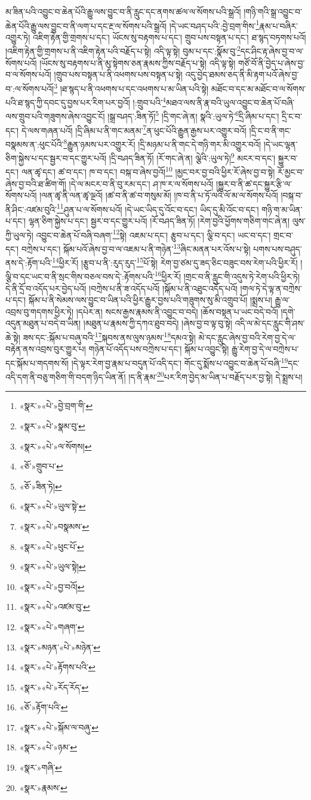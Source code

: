 མ་ཟིན་པའི་འབྱུང་བ་ཆེན་པོའི་རྒྱུ་ལས་བྱུང་བ་ནི་རླུང་དང་ནགས་ཚལ་ལ་སོགས་པའི་སྒྲའོ། །གཉི་གའི་སྒྲ་འབྱུང་བ་ཆེན་པོའི་རྒྱུ་ལས་བྱུང་བ་ནི་ལག་པ་དང་རྔ་ལ་སོགས་པའི་སྒྲའོ། །དེ་ཡང་བཤད་པའི་:བྱེ་བྲག་གིས་\footnote{«སྣར་»«པེ་»བྱེ་བྲག་གི་}རྣམ་པ་བཞིར་འགྱུར་ཏེ། འཇིག་རྟེན་གྱི་གྲགས་པ་དང་། ཡོངས་སུ་བརྟགས་པ་དང་། གྲུབ་པས་བསྟན་པ་དང་། ཐ་སྙད་བཏགས་པའོ། །འཇིག་རྟེན་གྱི་གྲགས་པ་ནི་འཇིག་རྟེན་པའི་བརྗོད་པ་སྟེ། འདི་ལྟ་སྟེ། བུམ་པ་དང་:སྣོམ་བུ་\footnote{«སྣར་»«པེ་»སྣམ་བུ་}དང་ཤིང་རྟ་ཞེས་བྱ་བ་ལ་སོགས་པའོ། །ཡོངས་སུ་བརྟགས་པ་ནི་མུ་སྟེགས་ཅན་རྣམས་ཀྱིས་བརྗོད་པ་སྟེ། འདི་ལྟ་སྟེ། གཙོ་བོ་ནི་བྱེད་པ་ཞེས་བྱ་བ་ལ་སོགས་པའོ། །གྲུབ་པས་བསྟན་པ་ནི་འཕགས་པས་བསྟན་པ་སྟེ། འདུ་བྱེད་ཐམས་ཅད་ནི་མི་རྟག་པའོ་ཞེས་བྱ་བ་:ལ་སོགས་པའོ།\footnote{«སྣར་»«པེ་»ལ་སོགས།} །ཐ་སྙད་པ་ནི་འཕགས་པ་དང་འཕགས་པ་མ་ཡིན་པའི་སྟེ། མཐོང་བ་དང་མ་མཐོང་བ་ལ་སོགས་པའི་ཐ་སྙད་ཀྱི་དབང་དུ་བྱས་པར་རིག་པར་བྱའོ། །:གྲུབ་པའི་\footnote{«ཅོ་»གྲུབ་པ་}མཐའ་ལས་ནི་རྣ་བའི་ཡུལ་འབྱུང་བ་ཆེན་པོ་བཞི་ལས་གྲུབ་པའི་གཟུགས་ཞེས་འབྱུང་ངོ། །སྒྲ་བཤད་:ཟིན་ཏོ།\footnote{«ཅོ་»ཟིན་ཏེ།} །དྲི་གང་ཞེ་ན། སྣའི་:ཡུལ་ཏེ་\footnote{«སྣར་»«པེ་»ཡུལ་སྟེ་}དྲི་ཞིམ་པ་དང་། དྲི་ང་བ་དང་། དེ་ལས་གཞན་པའོ། །དྲི་ཞིམ་པ་ནི་གང་མནམ་\footnote{«སྣར་»«པེ་»བསྣམས་}ན་ཕུང་པོའི་རྒྱུན་རྒྱས་པར་འགྱུར་བའོ། །དྲི་ང་བ་ནི་གང་བསྣམས་ན་:ཕུང་པོའི་\footnote{«སྣར་»«པེ་»ཕུང་པོ་}རྒྱུན་ཉམས་པར་འགྱུར་རོ། །དྲི་མཉམ་པ་ནི་གང་དེ་གཉི་གར་མི་འགྱུར་བའོ། །དེ་ཡང་ལྷན་ཅིག་སྐྱེས་པ་དང་སྦྱར་བ་དང་གྱུར་པའོ། །དྲི་བཤད་ཟིན་ཏོ། །རོ་གང་ཞེ་ན། ལྕེའི་:ཡུལ་ཏེ།\footnote{«སྣར་»«པེ་»ཡུལ་སྟེ།} མངར་བ་དང་། སྐྱུར་བ་དང་། ལན་ཚྭ་དང་། ཚ་བ་དང་། ཁ་བ་དང་། བསྐ་བ་ཞེས་བྱའོ།\footnote{«སྣར་»«པེ་»བྱ་བའོ།} །མྱང་བར་བྱ་བའི་ཕྱིར་རོ་ཞེས་བྱ་བ་སྟེ། རོ་མྱང་བ་ཞེས་བྱ་བའི་ཐ་ཚིག་གོ། །དེ་ལ་མངར་བ་ནི་བུ་རམ་དང་། ཤ་ཁ་ར་ལ་སོགས་པའོ། །སྐྱུར་བ་ནི་ཚ་དང་སྐྱུར་རྩི་ལ་སོགས་པའོ། །ལན་ཚྭ་ནི་ལན་ཚྭ་ལྔའོ། །ཚ་བ་ནི་ཚ་བ་གསུམ་མོ། །ཁ་བ་ནི་པ་ཏོ་ལའི་ལོ་མ་ལ་སོགས་པའོ། །བསྐ་བ་ནི་ཤིང་:འཛམ་བུའི་\footnote{«སྣར་»«པེ་»འཛམ་བུ་}ཤུན་པ་ལ་སོགས་པའོ། །དེ་ཡང་ཡིད་དུ་འོང་བ་དང་། ཡིད་དུ་མི་འོང་བ་དང་། གཉི་ག་མ་ཡིན་པ་དང་། ལྷན་ཅིག་སྐྱེས་པ་དང་། སྦྱར་བ་དང་གྱུར་པའོ། །རོ་བཤད་ཟིན་ཏོ། །རེག་བྱའི་ཕྱོགས་གཅིག་གང་ཞེ་ན། ལུས་ཀྱི་ཡུལ་ཏེ། འབྱུང་བ་ཆེན་པོ་བཞི་བཞག་\footnote{«སྣར་»«པེ་»གཞག་}སྟེ། འཇམ་པ་དང་། རྩུབ་པ་དང་། ལྕི་བ་དང་། ཡང་བ་དང་། གྲང་བ་དང་། བཀྲེས་པ་དང་། སྐོམ་པའོ་ཞེས་བྱ་བ་ལ་འཇམ་པ་ནི་གཉེན་\footnote{«སྣར་»མཉན་«པེ་»མཉེན་}ཞིང་མནན་པར་འོས་པ་སྟེ། པགས་པས་བཤུད་ནས་དེ་:རྟོག་པའི་\footnote{«སྣར་»«པེ་»རྟོགས་པའི་}ཕྱིར་རོ། །རྩུབ་པ་ནི་:རུད་རུད་\footnote{«སྣར་»«པེ་»རོད་རོད་}པོ་སྟེ། རེག་བྱ་ཙམ་དུ་ཟད་ཅིང་བཟུང་བས་རེག་པའི་ཕྱིར་རོ། །ལྕི་བ་དང་ཡང་བ་ནི་སྲང་གིས་བཅལ་བས་དེ་:རྟོགས་པའི་\footnote{«ཅོ་»རྟོག་པའི་}ཕྱིར་རོ། །གྲང་བ་ནི་རླུང་གི་འདུས་ཏེ་རེག་པའི་ཕྱིར་ཏེ། དེ་ནི་དྲོ་བ་འདོད་པར་བྱེད་པའོ། །བཀྲེས་པ་ནི་ཟ་འདོད་པའོ། །སྐོམ་པ་ནི་འཐུང་འདོད་པའོ། །གལ་ཏེ་དེ་ལྟ་ན་བཀྲེས་པ་དང་། སྐོམ་པ་ནི་སེམས་ལས་བྱུང་བ་ཡིན་པའི་ཕྱིར་རྒྱུར་བྱས་པའི་གཟུགས་སུ་མི་འགྲུབ་པོ། །སྨྲས་པ། རྒྱུ་ལ་འབྲས་བུ་གདགས་ཕྱིར་ཏེ། །དཔེར་ན། སངས་རྒྱས་རྣམས་ནི་འབྱུང་བ་བདེ། །ཆོས་བསྟན་པ་ཡང་བདེ་བའོ། །དགེ་འདུན་མཐུན་པ་བདེ་བ་ཡིན། །མཐུན་པ་རྣམས་ཀྱི་དཀའ་ཐུབ་བདེ། །ཞེས་བྱ་བ་ལྟ་བུ་སྟེ། འདི་ལ་མེ་དང་རླུང་གི་ཤས་ཆེ་སྟེ། ཟས་དང་:སྐོམ་པ་བཞུ་བའི་\footnote{«སྣར་»«པེ་»སྐོམ་ལ་བཞུ་}སྐབས་ནས་ལུས་ཉམས་\footnote{«སྣར་»«པེ་»ཉམ་}དམའ་སྟེ། མེ་དང་རླུང་ཞེས་བྱ་བའི་རེག་བྱ་དེ་ལ་བརྟེན་ནས་འབྲས་བུར་གྱུར་པ། གཉེན་པོ་འདོད་པས་བཀྲེས་པ་དང་། སྐོམ་པ་འབྱུང་སྟེ། རྒྱུ་རེག་བྱ་དེ་ལ་བཀྲེས་པ་དང་སྐོམ་པ་གདགས་སོ། །དེ་ལྟར་རེག་བྱ་རྣམ་པ་བདུན་པོ་འདི་དང་། གོང་དུ་སྨོས་པ་འབྱུང་བ་ཆེན་པོ་བཞི་\footnote{«སྣར་»གཞི་}དང་འདི་དག་ནི་བཅུ་གཅིག་གི་བདག་ཉིད་ཡིན་ནོ། །ད་ནི་རྣམ་\footnote{«སྣར་»རྣམས་}པར་རིག་བྱེད་མ་ཡིན་པ་བརྗོད་པར་བྱ་སྟེ། དེ་སྨྲས་པ། 